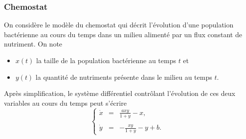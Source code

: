 \subsubsection{Chemostat \todo{}}


On considère le modèle du chemostat qui décrit l'évolution d'une population bactérienne au cours du temps dans un milieu alimenté par un flux constant de nutriment. 
On note
\begin{itemize}
  \item $x(t)$ la taille de la population bactérienne au temps $t$ et
  \item $y(t)$ la quantité de nutriments présente dans le milieu au temps $t$.
\end{itemize}
Après simplification, le système différentiel contrôlant l'évolution de ces deux variables au cours du temps peut s'écrire
$$
\left\{\begin{array}{rcl} 
        \dot x & = & \displaystyle{\frac{a x y}{1 + y} - x}, \\
        \\
        \dot y & = & \displaystyle{- \frac{x y}{1 + y} - y + b}. 
       \end{array}
\right.
$$

